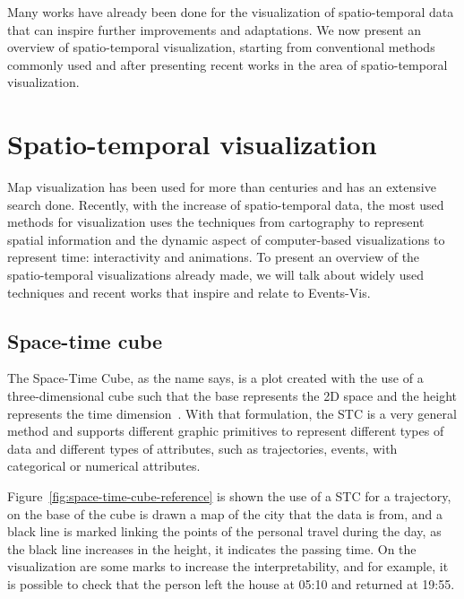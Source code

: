 \label{ch:related-works}

Many works have already been done for the visualization of spatio-temporal data that can inspire further improvements and adaptations.
%
We now present an overview of spatio-temporal visualization, starting from conventional methods commonly used and after presenting recent works in the area of spatio-temporal visualization.

\section{Spatio-temporal visualization}

Map visualization has been used for more than centuries and has an extensive search done.
%
Recently, with the increase of spatio-temporal data, the most used methods for visualization uses the techniques from cartography to represent spatial information and the dynamic aspect of computer-based visualizations to represent time: interactivity and animations. 
%
To present an overview of the spatio-temporal visualizations already made, we will talk about widely used techniques and recent works that inspire and relate to Events-Vis.

\subsection{Space-time cube}

The Space-Time Cube, as the name says, is a plot created with the use of a three-dimensional cube such that the base represents the 2D space and the height represents the time dimension~\cite{bach2017descriptive}.
%
With that formulation, the STC is a very general method and supports different graphic primitives to represent different types of data and different types of attributes, such as trajectories, events, with categorical or numerical attributes.
%

Figure~\ref{fig:space-time-cube-reference} is shown the use of a STC for a trajectory, on the base of the cube is drawn a map of the city that the data is from, and a black line is marked linking the points of the personal travel during the day, as the black line increases in the height, it indicates the passing time. On the visualization are some marks to increase the interpretability, and for example, it is possible to check that the person left the house at 05:10 and returned at 19:55.

